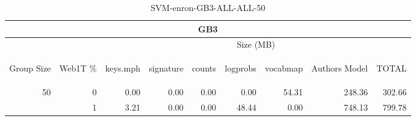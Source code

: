 \begin{center}
\begin{table}[htbp] 
 \begin{center}
\begin{tabular}{ | r | r | r | r | r | r | r | r | r |}
\hline
\multicolumn{9}{|c|}{GB3}\\
\hline
 & & \multicolumn{7}{|c|}{Size (MB)}\\ \cline{3-9}
\begin{sideways}Group Size\end{sideways} & \begin{sideways}Web1T \% \end{sideways} & \begin{sideways}keys.mph\end{sideways} & \begin{sideways}signature\end{sideways} & \begin{sideways}counts\end{sideways} & \begin{sideways}logprobs\end{sideways} & \begin{sideways}vocabmap\end{sideways} & \begin{sideways}Authors Model \end{sideways} & \begin{sideways}TOTAL\end{sideways}\\
\hline
\multirow{1}{*}{50}
 & 0 & 0.00 & 0.00 & 0.00 & 0.00 & 54.31 & 248.36 & 302.66\\ \cline{2-9}
 & 1 & 3.21 & 0.00 & 0.00 & 48.44 & 0.00 & 748.13 & 799.78\\ \cline{2-9}
\hline
\end{tabular}
\caption{SVM-enron-GB3-ALL-ALL-50}
\label{table:SVM-enron-GB3-ALL-ALL-50}
\end{center}
 \end{table}
\end{center}

